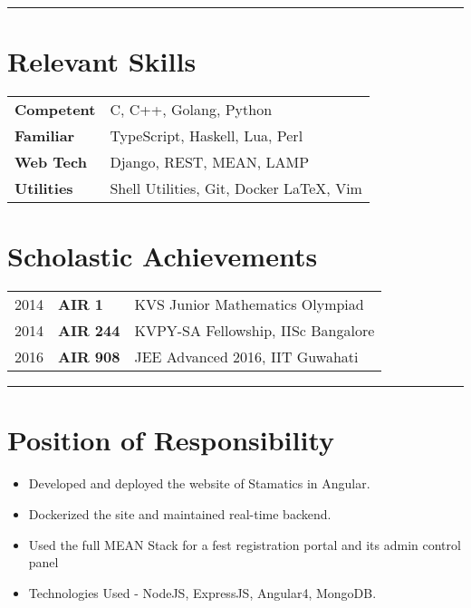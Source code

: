 \documentclass[10pt, margin=0.5in]{deedy-resume-openfont}
\begin{document}
\begin{minipage}[t]{0.48\textwidth}
\vspace{2pt}				%
\rule{\textwidth}{0.5pt}	%
\vspace{-14pt}				%

%
%
\section{Relevant Skills}
\vspace{0pt}
\begin{tabular}{ll}
 \textbf{Competent}  & C, C++, Golang, Python \\
 \textbf{Familiar}   & TypeScript, Haskell, Lua, Perl \\
 \textbf{Web Tech}   & Django, REST, MEAN, LAMP \\
 \textbf{Utilities}  & Shell Utilities, Git, Docker \LaTeX, Vim
\end{tabular}


%
%
\section{Scholastic Achievements}
\vspace{0pt}
\begin{tabular}{lll}
  2014	   & \textbf{AIR 1}  & KVS Junior Mathematics Olympiad\\
  2014	   & \textbf{AIR 244}& KVPY-SA Fellowship, IISc Bangalore \\
  2016     & \textbf{AIR 908}& JEE Advanced 2016, IIT Guwahati \\
\end{tabular}

\vspace{5pt}				%
\rule{\textwidth}{0.5pt}	%
\vspace{-14pt}				%

\section{Position of Responsibility}
\begin{itemize}[leftmargin=*, noitemsep]
  \item Developed and deployed the website of Stamatics in Angular.
  \item Dockerized the site and maintained real-time backend.	
\end{itemize}	
\begin{itemize}[leftmargin=*, noitemsep]
  \item Used the full MEAN Stack for a fest registration portal and its admin control panel	
  \item Technologies Used - NodeJS, ExpressJS, Angular4, MongoDB.	
\end{itemize}


\end{minipage}
\end{document}
